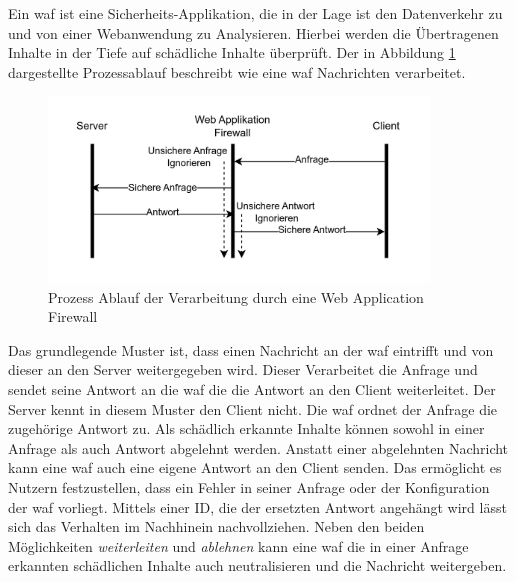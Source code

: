 \label{chap:waf-theory}
Ein \ac{waf} ist eine Sicherheits-Applikation, die in der Lage ist den Datenverkehr zu und von einer Webanwendung zu Analysieren.
Hierbei werden die Übertragenen Inhalte in der Tiefe auf schädliche Inhalte überprüft.
Der in Abbildung \ref{fig:waf-porcess-flow} dargestellte Prozessablauf beschreibt wie eine \ac{waf} Nachrichten verarbeitet.

\begin{figure}[!hbt]
    \centering
    \includegraphics[width=0.9\textwidth]{./images/Waf-Process-fliow.png}
    \caption{Prozess Ablauf der Verarbeitung durch eine Web Application Firewall}
    \label{fig:waf-porcess-flow}
\end{figure}

Das grundlegende Muster ist, dass einen Nachricht an der \ac{waf} eintrifft und von dieser an den Server weitergegeben wird.
Dieser Verarbeitet die Anfrage und sendet seine Antwort an die \ac{waf} die die Antwort an den Client weiterleitet.
Der Server kennt in diesem Muster den Client nicht.
Die \ac{waf} ordnet der Anfrage die zugehörige Antwort zu.
Als schädlich erkannte Inhalte können sowohl in einer Anfrage als auch Antwort abgelehnt werden.
Anstatt einer abgelehnten Nachricht kann eine \ac{waf} auch eine eigene Antwort an den Client senden.
Das ermöglicht es Nutzern festzustellen, dass ein Fehler in seiner Anfrage oder der Konfiguration der \ac{waf} vorliegt.
Mittels einer ID, die der ersetzten Antwort angehängt wird lässt sich das Verhalten im Nachhinein nachvollziehen.
Neben den beiden Möglichkeiten \textit{weiterleiten} und \textit{ablehnen} kann eine \ac{waf} die in einer Anfrage erkannten schädlichen Inhalte auch neutralisieren und die Nachricht weitergeben\cite{schmitzGrundlagenWebApplication2018}.\\

